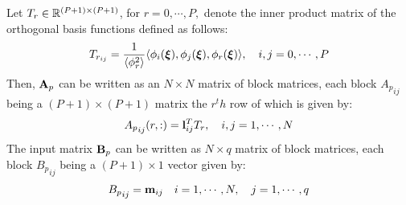 \documentclass[10pt, conference]{IEEEtran}
\begin{document}
Let $T_r \in \mathbb R^{(P+1)\times (P+1)}$, for $r=0,\cdots,P,$ denote the inner product matrix of the orthogonal basis functions defined as follows:
\begin{align}\label{ipmat}
T_{r_{ij}} = \frac{1}{\langle \phi_r^2 \rangle}\langle \phi_i(\boldsymbol{\xi}),\phi_j(\boldsymbol{\xi}),\phi_r(\boldsymbol{\xi}) \rangle, \quad i,j=0,\cdots,P
\end{align}
Then, $\mathbf{A}_p$ can be written as an $N\times N$ matrix of block matrices, each block ${A_p}_{ij}$ being a $(P+1)\times(P+1)$ matrix the $r^th$ row of which is given by:
\begin{align}
{A_p}_{ij}(r,:) = \mathbf{l}_{ij}^T T_r, \quad i,j=1,\cdots,N
\end{align}
The input matrix $\mathbf{B}_p$ can be written as $N \times q$ matrix of block matrices, each block ${B_p}_{ij}$ being a $(P+1)\times 1$ vector given by:
\begin{align}
{B_p}_{ij}= \mathbf{m}_{ij} \quad i=1,\cdots,N, \quad j=1,\cdots,q
\end{align}
\end{document}
